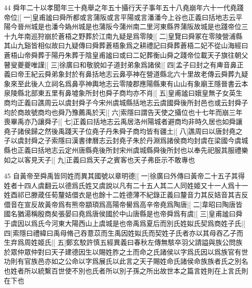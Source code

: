 44
舜年二十以孝聞年三十堯舉之年五十攝行天子事年五十八堯崩年六十一代堯踐帝位|[%
一]皇甫謐曰舜所都或言蒲阪或言平陽或言潘潘今上谷也正義曰括地志云平陽今晉州城是也潘今媯州城是也蒲阪今蒲州南二里河東縣界蒲阪故城是也踐帝位三十九年南巡狩崩於蒼梧之野葬於江南九疑是爲零陵|[%
二]皇覽曰舜冢在零陵營浦縣其山九谿皆相似故曰九疑傳曰舜葬蒼梧象爲之耕禮記曰舜葬蒼梧二妃不從山海經曰蒼梧山帝舜葬于陽丹朱葬于陰皇甫謐曰或曰二妃葬衡山舜之踐帝位載天子旗往朝父瞽叟夔夔唯謹|[%
三]徐廣曰和敬貌如子道封弟象爲諸侯|[%
四]孟子曰封之有庳音鼻正義曰帝王紀云舜弟象封於有鼻括地志云鼻亭神在營道縣北六十里故老傳云舜葬九疑象來至此後人立祠名爲鼻亭神輿地志云零陵郡應陽縣東有山山有象廟王隱晉書云本泉陵縣北部東五里有鼻墟象所封也舜子商均亦不肖|[%
五]皇甫謐曰娥皇無子女英生商均正義曰譙周云以虞封舜子今宋州虞城縣括地志云虞國舜後所封邑也或云封舜子均於商故號商均也舜乃豫薦禹於天|[%
六]索隱曰謂告天使之攝位也十七年而崩三年喪畢禹亦乃讓舜子|[%
七]正義曰括地志云禹居洛州陽城者避商均非時久居也如舜讓堯子諸侯歸之然後禹踐天子位堯子丹朱舜子商均皆有疆土|[%
八]譙周曰以唐封堯之子以虞封舜之子索隱曰漢書律曆志云封堯子朱於丹淵爲諸侯商均封虞在梁國今虞城縣也正義曰括地志云定州唐縣堯後所封宋州虞城縣舜後所封也以奉先祀服其服禮樂如之以客見天子|[%
九]正義曰爲天子之賓客也天子弗臣示不敢專也

45
自黃帝至舜禹皆同姓而異其國號以章明德|[%
一]徐廣曰外傳曰黃帝二十五子其得姓者十四人虞翻云以德爲氏姓又虞說以凡有二十五人其二人同姓姬又十一人爲十一姓酉祁已滕葴任荀釐姞儇衣是也餘十二姓德薄不紀錄正義曰釐音力其反姞音其吉反儇音在宣反故黃帝爲有熊帝顓頊爲高陽帝嚳爲高辛帝堯爲陶唐|[%
二]韋昭曰陶唐皆國名猶湯稱殷商矣張晏曰堯爲唐侯國於中山唐縣是也帝舜爲有虞|[%
三]皇甫謐曰舜𡣕于虞因以爲氏今河東大陽西山上虞城是也帝禹爲夏后而別氏姓姒氏契爲商姓子氏|[%
四]索隱曰禮緯曰禹母脩己吞薏苡而生禹因姓姒氏而契姓子氏者亦以其母吞乙子而生弃爲周姓姬氏|[%
五]鄭玄駮許慎五經異義曰春秋左傳無駭卒羽父請謚與族公問族於眾仲眾仲對曰天子建德因生以賜姓胙之土而命之氏諸侯以字爲氏因以爲族官有世功則有官族邑亦如之公命以字爲展氏以此言之天子賜姓命氏諸侯命族族者氏之別名也姓者所以統繫百世使不別也氏者所以別子孫之所出故世本之篇言姓則在上言氏則在下也


